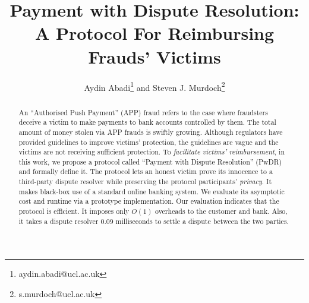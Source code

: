 \documentclass[orivec]{llncs}
\begin{document}
\title{Payment with Dispute Resolution: \\ A Protocol For Reimbursing  Frauds' Victims}

\author{%
Aydin Abadi\thanks{aydin.abadi@ucl.ac.uk} and
Steven J. Murdoch\thanks{s.murdoch@ucl.ac.uk}}

\maketitle{}


\begin{abstract}
An ``Authorised Push Payment'' (APP) fraud refers to the case where fraudsters deceive a victim to make payments to bank accounts controlled by them.  The total amount of money stolen via APP frauds is swiftly growing. Although regulators have provided guidelines to improve victims’ protection, the guidelines are vague and the victims are not receiving sufficient protection. To  \emph{facilitate victims' reimbursement}, in this work, we propose a protocol called  ``Payment with Dispute Resolution'' (PwDR) and formally define it. The protocol lets an honest victim prove its innocence to a third-party dispute resolver while preserving the protocol participants' \emph{privacy}. It makes black-box use of a standard online banking system. We evaluate its asymptotic cost and runtime via a prototype implementation. Our evaluation indicates that the protocol is efficient. It imposes only $O(1)$ overheads to the customer and bank.  Also, it takes a dispute resolver  $0.09$ milliseconds to settle a dispute between the two parties.
\end{abstract}












\appendix
%
%

%


\end{document}
